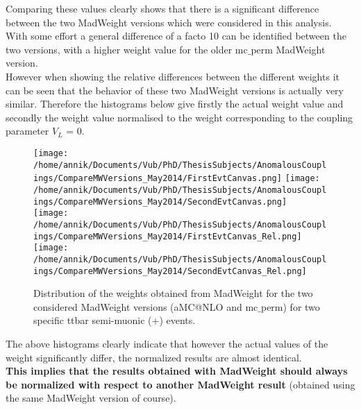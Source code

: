 Comparing these values clearly shows that there is a significant difference between the two MadWeight versions which were considered in this analysis. With some effort a general difference of a facto 10 can be identified between the two versions, with a higher weight value for the older mc$\_$perm MadWeight version.\\
However when showing the relative differences between the different weights it can be seen that the behavior of these two MadWeight versions is actually very similar. Therefore the histograms below give firstly the actual weight value and secondly the weight value normalised to the weight corresponding to the coupling parameter $V_L$ = 0.
\begin{figure}[!h]
\texttt{[image: /home/annik/Documents/Vub/PhD/ThesisSubjects/AnomalousCouplings/CompareMWVersions\_May2014/FirstEvtCanvas.png]}
\texttt{[image: /home/annik/Documents/Vub/PhD/ThesisSubjects/AnomalousCouplings/CompareMWVersions\_May2014/SecondEvtCanvas.png]}\\
\texttt{[image: /home/annik/Documents/Vub/PhD/ThesisSubjects/AnomalousCouplings/CompareMWVersions\_May2014/FirstEvtCanvas\_Rel.png]}
\texttt{[image: /home/annik/Documents/Vub/PhD/ThesisSubjects/AnomalousCouplings/CompareMWVersions\_May2014/SecondEvtCanvas\_Rel.png]}
\caption{Distribution of the weights obtained from MadWeight for the two considered MadWeight versions (aMC@NLO and mc$\_$perm) for two specific ttbar semi-muonic (+) events.}
\end{figure}

The above histograms clearly indicate that however the actual values of the weight significantly differ, the normalized results are almost identical.\\
\textbf{This implies that the results obtained with MadWeight should always be normalized with respect to another MadWeight result} (obtained using the same MadWeight version of course). 

